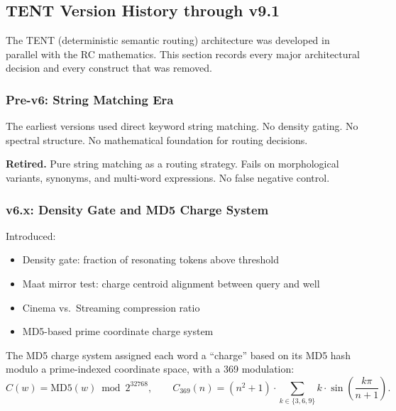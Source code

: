 \documentclass[11pt,twoside]{article}
\begin{document}
\subsection{TENT Version History through v9.1}

The TENT (deterministic semantic routing) architecture was developed in parallel with
the RC mathematics. This section records every major architectural decision and
every construct that was removed.

\subsubsection{Pre-v6: String Matching Era}

The earliest versions used direct keyword string matching. No density gating.
No spectral structure. No mathematical foundation for routing decisions.

\begin{retiredenv}
\textbf{Retired.} Pure string matching as a routing strategy. Fails on morphological
variants, synonyms, and multi-word expressions. No false negative control.
\end{retiredenv}

\subsubsection{v6.x: Density Gate and MD5 Charge System}

Introduced:
\begin{itemize}
  \item Density gate: fraction of resonating tokens above threshold
  \item Maat mirror test: charge centroid alignment between query and well
  \item Cinema vs.\ Streaming compression ratio
  \item MD5-based prime coordinate charge system
\end{itemize}

The MD5 charge system assigned each word a ``charge'' based on its MD5 hash modulo
a prime-indexed coordinate space, with a 369 modulation:
\[
  C(w) = \mathrm{MD5}(w) \bmod 2^{32768},
  \qquad
  C_{369}(n) = (n^2 + 1) \cdot \sum_{k \in \{3,6,9\}} k \cdot \sin\!\left(\frac{k\pi}{n+1}\right).
\]
\end{document}
